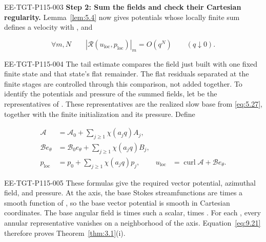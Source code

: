 \begin{EESegment}{EE-TGT-P115-003}
\noindent\textbf{Step 2: Sum the fields and check their Cartesian regularity.}
Lemma~\ref{lem:5.4} now gives potentials whose locally finite sum defines a velocity with
, and
\end{EESegment}
\begin{equation}
\forall m,N\qquad |\mathscr R(u_{\mathrm{loc}},p_{\mathrm{loc}})|_m=O(q^N)
\qquad(q\downarrow0).
\tag{9.20}\label{eq:9.20}
\end{equation}
\begin{EESegment}{EE-TGT-P115-004}
The tail estimate compares the field just built with one fixed finite state and that state's flat
remainder. The flat residuals separated at the finite stages are controlled through this comparison,
not added together. To identify the potentials and pressure of the summed fields, let
 be the representatives of
. These representatives are the realized slow base from
\eqref{eq:5.27}, together with the finite initialization and its pressure. Define
\end{EESegment}
\begin{equation}
\begin{aligned}
\mathcal A&=\mathcal A_0+\sum_{j\geq1}\chi(a_jq)A_j,\\
\mathcal Be_\theta&=\mathcal B_0e_\theta+\sum_{j\geq1}\chi(a_jq)B_j,\\
p_{\mathrm{loc}}&=p_0+\sum_{j\geq1}\chi(a_jq)p_j,
&u_{\mathrm{loc}}&=\operatorname{curl}\mathcal A+\mathcal Be_\theta.
\end{aligned}
\tag{9.21}\label{eq:9.21}
\end{equation}
\begin{EESegment}{EE-TGT-P115-005}
These formulas give the required vector potential, azimuthal field, and pressure. At the axis, the
base Stokes streamfunctions are  times a smooth function of
, so the base vector potential is smooth in Cartesian coordinates.
The base angular field is  times such a scalar, times
. For each , every annular representative
vanishes on a neighborhood of the axis. Equation~\eqref{eq:9.21} therefore proves
Theorem~\ref{thm:3.1}\textup{(i)}.
\end{EESegment}

